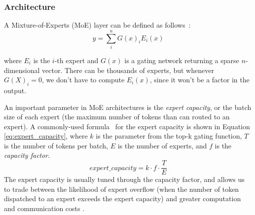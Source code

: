 \subsubsection{Architecture}

A Mixture-of-Experts (MoE) layer can be defined as follows~\cite{shazeer2017}:
\begin{equation}
    y = \sum_i^n G(x)_i E_i(x)
\end{equation}

where $E_i$ is the $i$-th expert and $G(x)$ is a gating network returning a sparse $n$-dimensional vector. There can be thousands of experts, but whenever $G(X)_i=0$, we don't have to compute $E_i(x)$, since it won't be a factor in the output.


An important parameter in MoE architectures is the \textit{expert capacity}, or the batch size of each expert (the maximum number of tokens than can routed to an expert). A commonly-used formula~\cite{tutel} for the expert capacity is shown in Equation \ref{eq:expert_capacity}, where $k$ is the parameter from the top-k gating function, $T$ is the number of tokens per batch, $E$ is the number of experts, and $f$ is the \textit{capacity factor}.
\begin{equation}\label{eq:expert_capacity}
    expert\_capacity = k \cdot f \cdot \frac{T}{E}
\end{equation}
The expert capacity is usually tuned through the capacity factor, and allows us to trade between the likelihood of expert overflow (when the number of token dispatched to an expert exceeds the expert capacity) and greater computation and communication costs \cite{switch_transformer}. 





